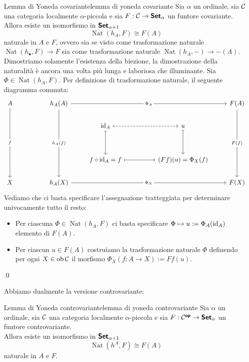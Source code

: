 \documentclass[openany]{book}
\renewcommand\C{\mc{C}}
\newcommand\nat{\operatorname{Nat}}
\begin{document}
\begin{theorem}{Lemma di Yoneda covariante}{lemma di yoneda covariante}
    Sia $\alpha$ un ordinale, sia $\C$ una categoria localmente $\alpha$-piccola e sia $F:\C\to\setcat_\alpha$ un funtore covariante.\\ Allora esiste un isomorfismo in $\text{\sffamily\textbf{Set}}_{\alpha +1}$
    \[ \nat (h_A, F) \cong F(A)\]
    naturale in $A$ e $F$, ovvero sia se visto come trasformazione naturale $\nat(h_\bullet, F)\to F$ sia come trasformazione naturale $\nat(h_A,-)\to -(A)$.
    \proof 
    Dimostriamo solamente l'esistenza della biezione, la dimostrazione della naturalità è ancora una volta più lunga e laboriosa che illuminante.
    Sia $\Phi \in \nat(h_A,F)$. Per definizione di trasformazione naturale, il seguente diagramma commuta: 
    \[\begin{tikzcd}
    	A && {h_A(A)} &&&& {F(A)} \\
    	&&& {\id_A} && u \\
    	\\
    	&&& {f\circ \id_A = f} && {(Ff)(u)=\Phi_X(f)} \\
    	X && {h_A(X)} &&&& {F(X)}
    	\arrow["f"{description}, from=1-1, to=5-1]
    	\arrow["{\Phi_A}"{description}, from=1-3, to=1-7]
    	\arrow["{h_A(f)}"{description}, from=1-3, to=5-3]
    	\arrow["{F(f)}"{description}, from=1-7, to=5-7]
    	\arrow[dashed, maps to, from=2-4, to=2-6]
    	\arrow[maps to, from=2-4, to=4-4]
    	\arrow[maps to, from=2-6, to=4-6]
    	\arrow[maps to, from=4-4, to=4-6]
    	\arrow["{\Phi_X}"{description}, from=5-3, to=5-7]
    \end{tikzcd}\]
    Vediamo che ci basta specificare l'assegnazione tratteggiata per determinare univocamente tutto il resto:\begin{itemize}
        \item Per ciascuna $\Phi \in \nat(h_A, F)$ ci basta specificare $\Phi \mapsto u :=\Phi_A(\operatorname{id}_A)$ elemento di $F(A)$.
        \item Per ciascun $u \in F(A)$ costruiamo la trasformazione naturale $\Phi$ definendo per ogni $X \in \ob\C$ il morfismo $\Phi_X(f:A\to X) := Ff(u)$.
    \end{itemize} 
    \qed
\end{theorem}

Abbiamo dualmente la versione controvariante:

\begin{corollary}{Lemma di Yoneda controvariante}{lemma di yoneda controvariante}
    Sia $\alpha$ un ordinale, sia $\C$ una categoria localmente $\alpha$-piccola e sia $F:\C^\op\to\setcat_\alpha$ un funtore controvariante.\\
    Allora esiste un isomorfismo in $\text{\sffamily\textbf{Set}}_{\alpha + 1}$
    \[ \nat (h^A, F) \cong F(A)\]
    naturale in $A$ e $F$.
\end{corollary}
\end{document}
